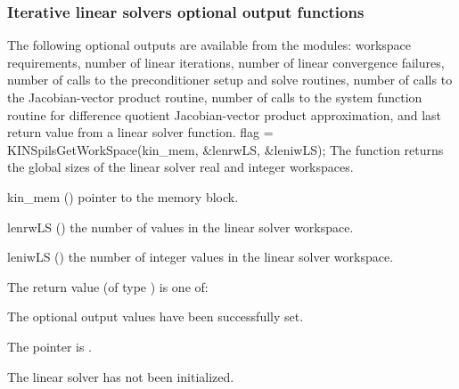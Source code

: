 \subsubsection{Iterative linear solvers optional output functions}\label{sss:optout_spils}
The following optional outputs are available from the {\kinspils}
modules: workspace requirements, number of linear iterations, number of
linear convergence failures, number of calls to the preconditioner
setup and solve routines, number of calls to the Jacobian-vector
product routine, number of calls to the system function routine for
difference quotient Jacobian-vector product approximation, and last
return value from a linear solver function.
{
  flag = KINSpilsGetWorkSpace(kin\_mem, \&lenrwLS, \&leniwLS);
}
{
  The function  returns the global sizes of the
  linear solver real and integer workspaces.
}
{
  \begin{args}
  \item[kin\_mem] ()
    pointer to the {\kinsol} memory block.
  \item[lenrwLS] ()
    the number of  values in the linear solver workspace.
  \item[leniwLS] ()
    the number of integer values in the linear solver workspace.
  \end{args}
}
{
  The return value  (of type ) is one of:
  \begin{args}
  \item[\Id{KINSPILS\_SUCCESS}] 
    The optional output values have been successfully set.
  \item[\Id{KINSPILS\_MEM\_NULL}]
    The  pointer is .
  \item[\Id{KINSPILS\_LMEM\_NULL}]
    The {\kinspgmr} linear solver has not been initialized.
  \end{args}
}
